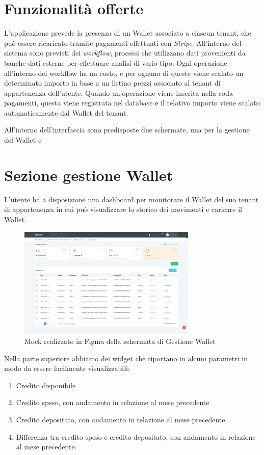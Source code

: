 \section{Funzionalità offerte}
L'applicazione prevede la presenza di un Wallet associato a ciascun tenant, che pu\`o essere ricaricato tramite pagamenti effettuati con \textit{Stripe}.
All'interno del sistema sono previsti dei \textit{workflow}, processi che utilizzano dati provenienti da banche dati esterne per effettuare analisi di vario tipo.
Ogni operazione all'interno del workflow ha un costo, e per ognuna di queste viene scalato un determinato importo in base a un listino prezzi associato al tenant di appartenenza dell'utente.
Quando un'operazione viene inserita nella coda pagamenti, questa viene registrata nel database e il relativo importo viene scalato automaticamente dal Wallet del tenant.

All'interno dell'interfaccia sono predisposte due schermate, una per la gestione del Wallet e

\section{Sezione gestione Wallet}
L'utente ha a disposizione una dashboard per monitorare il Wallet del suo tenant di appartenenza in cui può visualizzare lo storico dei movimenti e caricare il Wallet.

\begin{figure}[H]
  \centering
  \includegraphics[width=8.5cm]{images/gestione-wallet/mock-gestione-wallet.png}
  \caption{Mock realizzato in Figma della schermata di Gestione Wallet}
\end{figure}

Nella parte superiore abbiamo dei widget che riportano in alcuni parametri in modo da essere facilmente visualizzabili:
\begin{enumerate}
  \item Credito disponibile
  \item Credito speso, con andamento in relazione al mese precedente
  \item Credito depositato, con andamento in relazione al mese precedente
  \item Differenza tra credito speso e credito depositato, con andamento in relazione al mese precedente.
\end{enumerate}

